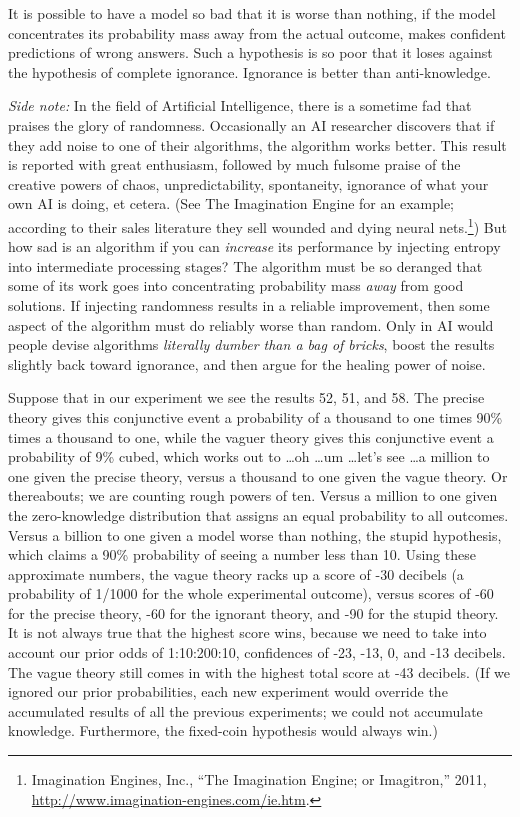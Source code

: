 {
 It is possible to have a model so bad that it is worse than
nothing, if the model concentrates its probability mass away from the
actual outcome, makes confident predictions of wrong answers. Such a
hypothesis is so poor that it loses against the hypothesis of complete
ignorance. Ignorance is better than anti-knowledge.}

{
 \textit{Side note:} In the field of Artificial Intelligence, there
is a sometime fad that praises the glory of randomness. Occasionally an
AI researcher discovers that if they add noise to one of their
algorithms, the algorithm works better. This result is reported with
great enthusiasm, followed by much fulsome praise of the creative
powers of chaos, unpredictability, spontaneity, ignorance of what your
own AI is doing, et cetera. (See The Imagination Engine for an example;
according to their sales literature they sell wounded and dying neural
nets.\footnote{Imagination Engines, Inc., ``The Imagination
Engine{\texttrademark}; or
Imagitron{\texttrademark},'' 2011,
\url{http://www.imagination-engines.com/ie.htm}.}) But how sad is an algorithm if you can
\textit{increase} its performance by injecting entropy into
intermediate processing stages? The algorithm must be so deranged that
some of its work goes into concentrating probability mass \textit{away}
from good solutions. If injecting randomness results in a reliable
improvement, then some aspect of the algorithm must do reliably worse
than random. Only in AI would people devise algorithms
\textit{literally dumber than a bag of bricks}, boost the results
slightly back toward ignorance, and then argue for the healing power of
noise.}

{
 Suppose that in our experiment we see the results 52, 51, and 58.
The precise theory gives this conjunctive event a probability of a
thousand to one times 90\% times a thousand to one, while the vaguer
theory gives this conjunctive event a probability of 9\% cubed, which
works out to \ldots oh \ldots um \ldots let's see \ldots a
million to one given the precise theory, versus a thousand to one given
the vague theory. Or thereabouts; we are counting rough powers of ten.
Versus a million to one given the zero-knowledge distribution that
assigns an equal probability to all outcomes. Versus a billion to one
given a model worse than nothing, the stupid hypothesis, which claims a
90\% probability of seeing a number less than 10. Using these
approximate numbers, the vague theory racks up a score of -30 decibels
(a probability of 1/1000 for the whole experimental outcome), versus
scores of -60 for the precise theory, -60 for the ignorant theory, and
-90 for the stupid theory. It is not always true that the highest score
wins, because we need to take into account our prior odds of
1:10:200:10, confidences of -23, -13, 0, and -13 decibels. The vague
theory still comes in with the highest total score at -43 decibels. (If
we ignored our prior probabilities, each new experiment would override
the accumulated results of all the previous experiments; we could not
accumulate knowledge. Furthermore, the fixed-coin hypothesis would
always win.)}

